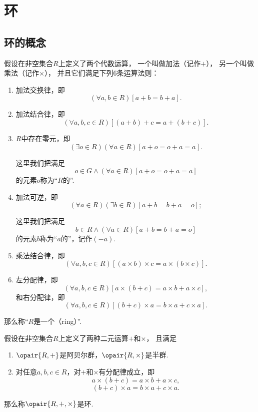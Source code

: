 \section{环}
\subsection{环的概念}
\begin{definition}
假设在非空集合\(R\)上定义了两个代数运算，
一个叫做加法（记作\(+\)），
另一个叫做乘法（记作\(\times\)），
并且它们满足下列6条运算法则：
\begin{enumerate}
    \item 加法交换律，即\[
        (\forall a,b \in R)[a+b = b+a].
    \]

    \item 加法结合律，即\[
        (\forall a,b,c \in R)[(a+b)+c = a+(b+c)].
    \]

    \item \(R\)中存在零元，即\[
        (\exists o \in R)(\forall a \in R)[a+o = o+a = a].
    \]

	这里我们把满足\[
		o \in G
		\land
		(\forall a \in R)[a+o = o+a = a]
	\]的元素\(o\)称为“\(R\)的”.

    \item 加法可逆，即\[
        (\forall a \in R)(\exists b \in R)[a+b = b+a = o];
    \]

	这里我们把满足\[
		b \in R
		\land
        (\forall a \in R)[a+b = b+a = o]
	\]的元素\(b\)称为“\(a\)的”，记作\((-a)\).

    \item 乘法结合律，即\[
        (\forall a,b,c \in R)
        [ (a \times b) \times c = a \times (b \times c) ].
    \]

    \item 左分配律，即\[
        (\forall a,b,c \in R)[ a \times (b+c) = a \times b + a \times c ],
    \]
    和右分配律，即\[
        (\forall a,b,c \in R)[ (b+c) \times a = b \times a + c \times a ].
    \]
\end{enumerate}
那么称“\(R\)是一个（ring）”.
\end{definition}

\begin{theorem}
假设在非空集合\(R\)上定义了两种二元运算\(+\)和\(\times\)，
且满足\begin{enumerate}
    \item \(\opair{R,+}\)是阿贝尔群，\(\opair{R,\times}\)是半群.

    \item 对任意\(a,b,c \in R\)，对\(+\)和\(\times\)有分配律成立，即\[
        a \times (b + c) = a \times b + a \times c,
    \]\[
        (b + c) \times a = b \times a + c \times a.
    \]
\end{enumerate}
那么称\(\opair{R,+,\times}\)是环.
\end{theorem}

